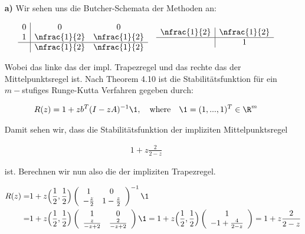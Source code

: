 \begin{solution}
 \begin{itemize}
   \item[\textbf{a)}]Wir sehen uns die Butcher-Schemata der Methoden an:

    \begin{align*}
      \begin{array}{c|cc}
        0 & 0 & 0 \\
        1 & \nfrac{1}{2} & \nfrac{1}{2} \\
        \hline
        & \nfrac{1}{2} & \nfrac{1}{2}
      \end{array}
      \quad
      \begin{array}{c|c}
        \nfrac{1}{2} & \nfrac{1}{2} \\
        \hline
        & 1
      \end{array}
    \end{align*}

    Wobei das linke das der impl. Trapezregel und das rechte das der Mittelpunktsregel ist.
    Nach Theorem 4.10 ist die Stabilitätsfunktion für ein $m-$stufiges Runge-Kutta
    Verfahren gegeben durch:

    \begin{align*}
      R(z) = 1 +zb^T (I- zA)^{-1} \1, \quad \text{where} \quad \1 =(1,...,1)^T
      \in \R^m
    \end{align*}

    Damit sehen wir, dass die Stabilitätsfunktion der impliziten Mittelpunktsregel

    \begin{align*}
        1+z \frac{2}{2-z}
    \end{align*}

    ist. Berechnen wir nun also die der impliziten Trapezregel.

    \begin{align*}
      R(z) =& 1 +z\Big(\frac{1}{2}, \frac{1}{2}\Big) \left(
      \begin{array}{cc}
        1 & 0 \\
        -\frac{z}{2} & 1- \frac{z}{2}
      \end{array}
      \right)^{-1}
      \1 \\
      =& 1 +z \Big(\frac{1}{2}, \frac{1}{2}\Big) \left(
      \begin{array}{cc}
        1 & 0 \\
        \frac{z}{-z+2} & \frac{2}{-z+2}
      \end{array}
      \right)
      \1 = 1+z\Big(\frac{1}{2},\frac{1}{2}\Big) \left(
      \begin{array}{c}
        1 \\
        -1+\frac{4}{2-z}
      \end{array}
      \right) = 1+z\frac{2}{2-z}
    \end{align*}


\end{itemize}
\end{solution}
